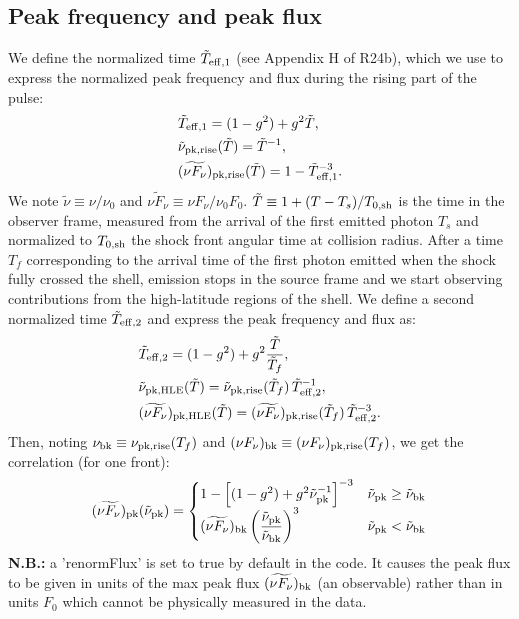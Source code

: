\documentclass{article}
\newcommand{\sh}{{\rm sh}}
\newcommand{\pk}{{\rm pk}}
\newcommand{\bk}{{\rm bk}}
\newcommand{\rise}{{\rm rise}}
\newcommand{\HLE}{{\rm HLE}}
\begin{document}
\subsection{Peak frequency and peak flux}\label{sec:pks_R24}
We define the normalized time $\tilde{T}_{\rm eff,1}$ (see Appendix H of R24b), which we use to express the normalized peak frequency and flux during the rising part of the pulse:
\begin{align}
    &\tilde{T}_{\rm eff,1} = (1-g^2) + g^2 \tilde{T},\\
    &\tilde{\nu}_{\pk,\rise}(\tilde{T}) = \tilde{T}^{-1},\label{eqn:nupk_R24}\\
    &(\widetilde{\nu F_\nu})_{\pk,\rise}(\tilde{T}) = 1 - \tilde{T}_{\rm eff, 1}^{-3}.\label{eqn:nFpk_R24}
\end{align}
We note $\tilde{\nu}\equiv\nu/\nu_0$ and $\widetilde{\nu F_\nu}\equiv\nu F_\nu/\nu_0F_0$. $\tilde{T}\equiv 1 +(T-T_s)/T_{0,\sh}$ is the time in the observer frame, measured from the arrival of the first emitted photon $T_s$ and normalized to $T_{0,\sh}$ the shock front angular time at collision radius. After a time $T_f$ corresponding to the arrival time of the first photon emitted when the shock fully crossed the shell, emission stops in the source frame and we start observing contributions from the high-latitude regions of the shell. We define a second normalized time $\tilde{T}_{\rm eff,2}$ and express the peak frequency and flux as:
\begin{align}
    &\tilde{T}_{\rm eff,2} = (1-g^2) + g^2 \frac{\tilde{T}}{\tilde{T}_f},\\
    &\tilde{\nu}_{\pk,\HLE}(\tilde{T}) = \tilde{\nu}_{\pk,\rise}(\tilde{T}_f)\,\tilde{T}_{\rm eff,2}^{-1},\label{eqn:nupk_HLE}\\
    &(\widetilde{\nu F_\nu})_{\pk,\HLE}(\tilde{T}) = (\widetilde{\nu F_\nu})_{\pk,\rise}(\tilde{T}_f)\,\tilde{T}_{\rm eff,2}^{-3}.\label{eqn:nFpk_HLE}
\end{align}
Then, noting $\nu_\bk\equiv\nu_{\pk,\rise}(T_f)$ and $(\nu F_\nu)_\bk\equiv (\nu F_\nu)_{\pk,\rise}(T_f)$, we get the correlation (for one front):
\begin{equation}
(\widetilde{\nu F_\nu})_\pk(\tilde{\nu}_\pk) = \begin{cases}
        1 - \left[(1-g^2) + g^2\tilde{\nu}_\pk^{-1}\right]^{-3}&\tilde{\nu}_\pk\geq\tilde{\nu}_\bk\\
        (\widetilde{\nu F_\nu})_\bk\left(\dfrac{\tilde{\nu}_\pk}{\tilde{\nu}_\bk}\right)^3&\tilde{\nu}_\pk<\tilde{\nu}_\bk
    \end{cases}\label{eqn:pk_corr}
\end{equation}
\textbf{N.B.:} a 'renormFlux' is set to true by default in the code. It causes the peak flux to be given in units of the max peak flux $(\widetilde{\nu F_\nu})_\bk$ (an observable) rather than in units $F_0$ which cannot be physically measured in the data.
\end{document}
